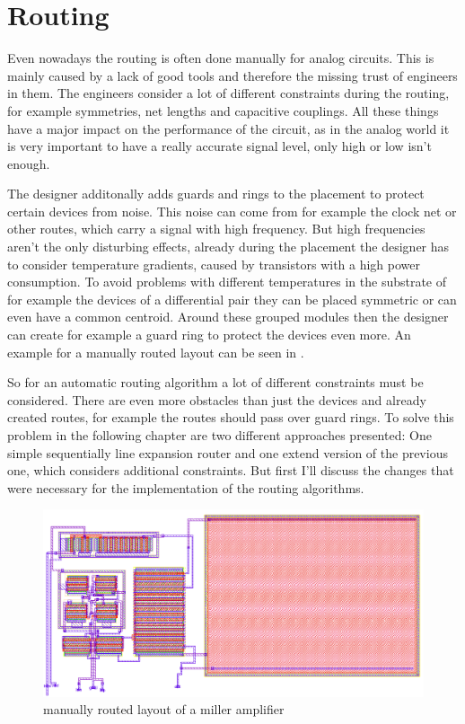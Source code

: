 \chapter{Routing}

Even nowadays the routing is often done manually for analog circuits. This is mainly caused by a lack of good tools and therefore the missing trust of engineers in them. The engineers consider a lot of different constraints during the routing, for example symmetries, net lengths and capacitive couplings. All these things have a major impact on the performance of the circuit, as in the analog world it is very important to have a really accurate signal level, only high or low isn't enough.

The designer additonally adds guards and rings to the placement to protect certain devices from noise. This noise can come from for example the clock net or other routes, which carry a signal with high frequency. But high frequencies aren't the only disturbing effects, already during the placement the designer has to consider temperature gradients, caused by transistors with a high power consumption. To avoid problems with different temperatures in the substrate of for example the devices of a differential pair they can be placed symmetric or can even have a common centroid. Around these grouped modules then the designer can create for example a guard ring to protect the devices even more. An example for a manually routed layout can be seen in .

So for an automatic routing algorithm a lot of different constraints must be considered. There are even more obstacles than just the devices and already created routes, for example the routes should pass over guard rings. To solve this problem in the following chapter are two different approaches presented: One simple sequentially line expansion router and one extend version of the previous one, which considers additional constraints. But first I'll  discuss the changes that were necessary for the implementation of the routing algorithms.

\begin{figure}
	\centering
	\includegraphics[scale=.4]{FIG/miller_amplifier_layout_routed.png}
  	\caption{manually routed layout of a miller amplifier}
	\label{fig:miller_amplifier_routed_layout}
\end{figure}

